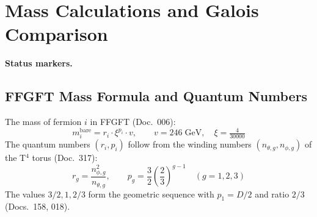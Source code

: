 
\providecommand{\BM}{\textbf{[B]}}
\providecommand{\KM}{\textbf{[K]}}
\providecommand{\SM}{\textbf{[S]}}

\chapter*{Mass Calculations and Galois Comparison}

\begin{abstract}
This document places the FFGFT mass calculations of the three lepton generations
alongside the corresponding Galois structures in GF$(3^n)$.

The main result: $(m_\mu/m_e)^2 = 43200$ is exact and identical in both
frameworks — FFGFT from quantum numbers $(r_i, p_i)$, Galois from group orders
$|\text{GF}(9)^*|^2 \cdot 5^2 \cdot |\text{GF}(27)|$. The equality is not a
numerical coincidence but an algebraic identity from which $\xi = 4/30000$
follows as a Galois number~\KM.

The remaining deviation of bare masses from experiment ($\sim$0.5\%) is neither
a measurement error nor $K_\text{frac}$; it is an empirical discrepancy.
The candidate is the fractal-recursive correction of higher order from the
torus winding numbers; the physical attribution is open.
Verification scripts: \texttt{pruef\_330}, \texttt{pruef\_331}.
\end{abstract}
\medskip\noindent\textbf{Status markers.}



\section{FFGFT Mass Formula and Quantum Numbers}

The mass of fermion $i$ in FFGFT (Doc.~006):
\begin{equation}
  m_i^{\text{bare}} = r_i \cdot \xi^{p_i} \cdot v,
  \qquad v = 246\;\text{GeV},\quad \xi = \tfrac{4}{30000}
\end{equation}
The quantum numbers $(r_i, p_i)$ follow from the winding numbers
$(n_{\theta,g}, n_{\phi,g})$ of the T$^4$ torus (Doc.~317):
\begin{equation}
  r_g = \frac{n_{\phi,g}^2}{n_{\theta,g}},
  \qquad p_g = \frac{3}{2}\left(\frac{2}{3}\right)^{g-1}
  \quad (g = 1, 2, 3)
\end{equation}
The values $3/2, 1, 2/3$ form the geometric sequence with $p_1 = D/2$ and
ratio $2/3$ (Docs.~158, 018).

